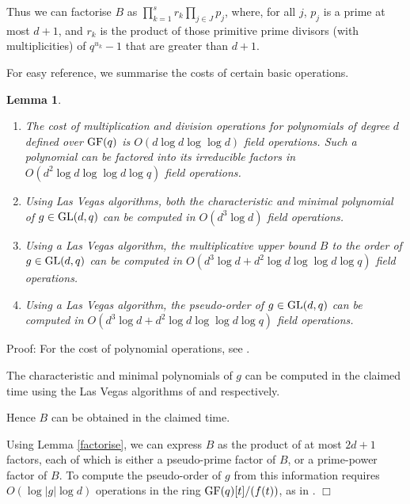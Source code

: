 \documentclass[12pt]{article}
\newtheorem{lemma}[definition]{Lemma}
\newenvironment{proof}{\normalsize {\sc Proof}:}{{\hfill $\Box$ \\}}
\def\GL{{\rm GL}}
\def\Oh{O}  %
\def\GF{{\rm GF}}
\begin{document}
Thus we can factorise $B$ as
$\prod_{k=1}^sr_k\prod_{j\in J}p_j$, where, for all $j$,
$p_j$ is a prime at most $d+1$, and $r_k$ is the product of those
 primitive prime divisors (with multiplicities) of
$q^{u_k}-1$ that are greater than $d+1$.

For easy reference, we summarise the costs of certain basic operations.
\begin{lemma}\label{pseudo}
\mbox{}
\begin{enumerate}
\item[\rm (i)]
The cost of multiplication and division operations for polynomials of
degree $d$ defined over $\GF(q)$ is $\Oh(d\log d\log\log d)$ field
operations.
Such a polynomial can be factored into its irreducible factors in
$\Oh(d^2 \log d \log\log d\log q)$ field operations.

\item[\rm (ii)] Using Las Vegas algorithms, both
the characteristic and minimal polynomial of
$g \in \GL(d, q)$ can be computed
in $\Oh(d^3 \log d)$ field operations.

\item[\rm (iii)] Using a Las Vegas algorithm,
the multiplicative upper bound $B$
to the order of $g \in \GL(d, q)$ can be computed in
$\Oh(d^3 \log d + d^2 \log d \log\log d \log q)$ field operations.

\item[\rm (iv)] Using a Las Vegas algorithm,
the pseudo-order of $g \in \GL(d, q)$ can be computed in
$\Oh(d^3 \log d + d^2 \log d \log\log d \log q)$ field operations.
\end{enumerate}
\end{lemma}
\begin{proof}
For the cost of polynomial operations, see
\cite[\S 8.3, \S 9.1, Theorem 14.14]{vzg}.

The characteristic and minimal polynomials of $g$ can be computed
in the claimed time using
the Las Vegas algorithms of \cite{Ambrose,KG}
and \cite{Giesbrecht} respectively.

Hence $B$ can be obtained in the claimed time.

Using Lemma \ref{factorise}, we can express $B$ as the product of
at most $2d + 1$ factors, each of which is either
a pseudo-prime factor of $B$, or a prime-power factor of $B$.
To compute the pseudo-order of $g$ from this information
requires $\Oh(\log |g| \log d)$ operations in the
ring $\GF(q)[t]/(f(t))$, as in \cite{CLG97}.
\end{proof}
\end{document}
